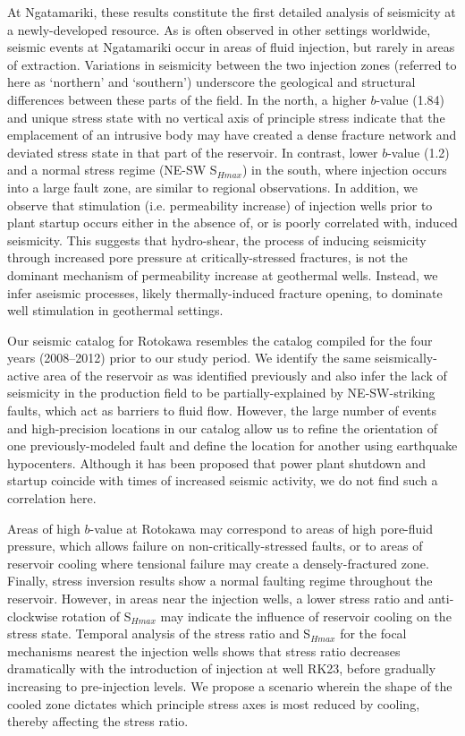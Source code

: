 At Ngatamariki, these results constitute the first detailed analysis of seismicity at a newly-developed resource.  As is often observed in other settings worldwide, seismic events at Ngatamariki occur in areas of fluid injection, but rarely in areas of extraction. Variations in seismicity between the two injection zones (referred to here as `northern' and `southern') underscore the geological and structural differences between these parts of the field. In the north, a higher $b$-value (1.84) and unique stress state with no vertical axis of principle stress indicate that the emplacement of an intrusive body may have created a  dense fracture network and deviated stress state in that part of the reservoir. In contrast, lower $b$-value (1.2) and a normal stress regime (NE-SW S$_{Hmax}$) in the south, where injection occurs into a large fault zone, are similar to regional observations. In addition, we observe that stimulation (i.e. permeability increase) of injection wells prior to plant startup occurs either in the absence of, or is poorly correlated with, induced seismicity. This suggests that hydro-shear, the process of inducing seismicity through increased pore pressure at critically-stressed fractures, is not the dominant mechanism of permeability increase at geothermal wells. Instead, we infer aseismic processes, likely thermally-induced fracture opening, to dominate well stimulation in geothermal settings.

Our seismic catalog for Rotokawa resembles the catalog compiled for the four years (2008--2012) prior to our study period. We identify the same seismically-active area of the reservoir as was identified previously and also infer the lack of seismicity in the production field to be partially-explained by NE-SW-striking faults, which act as barriers to fluid flow. However, the large number of events and high-precision locations in our catalog allow us to refine the orientation of one previously-modeled fault and define the location for another using earthquake hypocenters. Although it has been proposed that power plant shutdown and startup coincide with times of increased seismic activity, we do not find such a correlation here.

Areas of high $b$-value at Rotokawa may correspond to areas of high pore-fluid pressure, which allows failure on non-critically-stressed faults, or to areas of reservoir cooling where tensional failure may create a densely-fractured zone. Finally, stress inversion results show a normal faulting regime throughout the reservoir. However, in areas near the injection wells, a lower stress ratio and anti-clockwise rotation of S$_{Hmax}$ may indicate the influence of reservoir cooling on the stress state. Temporal analysis of the stress ratio and S$_{Hmax}$ for the focal mechanisms nearest the injection wells shows that stress ratio decreases dramatically with the introduction of injection at well RK23, before gradually increasing to pre-injection levels. We propose a scenario wherein the shape of the cooled zone dictates which principle stress axes is most reduced by cooling, thereby affecting the stress ratio.

